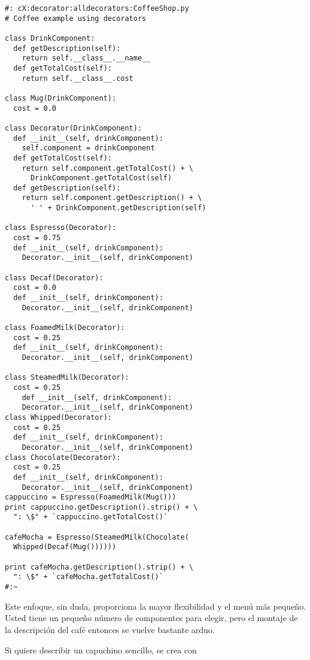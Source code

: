 \begin{lstlisting} 
#: cX:decorator:alldecorators:CoffeeShop.py 
# Coffee example using decorators

class DrinkComponent: 
  def getDescription(self): 
    return self.__class__.__name__ 
  def getTotalCost(self): 
    return self.__class__.cost 
    
class Mug(DrinkComponent): 
  cost = 0.0 
  
class Decorator(DrinkComponent): 
  def __init__(self, drinkComponent): 
    self.component = drinkComponent 
  def getTotalCost(self): 
    return self.component.getTotalCost() + \ 
      DrinkComponent.getTotalCost(self) 
  def getDescription(self): 
    return self.component.getDescription() + \ 
      ' ' + DrinkComponent.getDescription(self) 
      
class Espresso(Decorator): 
  cost = 0.75 
  def __init__(self, drinkComponent): 
    Decorator.__init__(self, drinkComponent) 
    
class Decaf(Decorator): 
  cost = 0.0 
  def __init__(self, drinkComponent): 
    Decorator.__init__(self, drinkComponent) 
    
class FoamedMilk(Decorator): 
  cost = 0.25 
  def __init__(self, drinkComponent): 
    Decorator.__init__(self, drinkComponent) 
    
class SteamedMilk(Decorator): 
  cost = 0.25 
    def __init__(self, drinkComponent): 
    Decorator.__init__(self, drinkComponent) 
class Whipped(Decorator): 
  cost = 0.25 
  def __init__(self, drinkComponent): 
    Decorator.__init__(self, drinkComponent) 
class Chocolate(Decorator): 
  cost = 0.25 
  def __init__(self, drinkComponent): 
    Decorator.__init__(self, drinkComponent) 
cappuccino = Espresso(FoamedMilk(Mug())) 
print cappuccino.getDescription().strip() + \ 
  ": \$" + `cappuccino.getTotalCost()`
  
cafeMocha = Espresso(SteamedMilk(Chocolate( 
  Whipped(Decaf(Mug()))))) 
  
print cafeMocha.getDescription().strip() + \ 
  ": \$" + `cafeMocha.getTotalCost()` 
#:~ 
\end{lstlisting}

Este enfoque, sin duda, proporciona la mayor flexibilidad y el menú más pequeño. Usted tiene un pequeño número de componentes para elegir,  pero el montaje de la descripción del café entonces se vuelve bastante arduo.   \newline

Si quiere describir un capuchino sencillo, se crea con \newline

